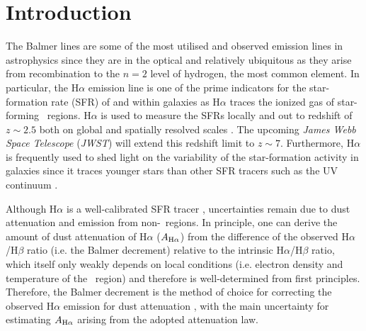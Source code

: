 \documentclass[fleqn,usenatbib]{mnras}
\newcommand\HII{\ion{H}{II}~} %
\begin{document}


\section{Introduction}
\label{sec:intro}

The Balmer lines are some of the most utilised and observed emission lines in astrophysics since they are in the optical and relatively ubiquitous as they arise from recombination to the $n=2$ level of hydrogen, the most common element. In particular, the H$\alpha$ emission line is one of the prime indicators for the star-formation rate (SFR) of and within galaxies as H$\alpha$ traces the ionized gas of star-forming \HII regions. H$\alpha$ is used to measure the SFRs locally and out to redshift of $z\sim2.5$ both on global \citep[][]{kennicutt83, lee09_UVHa, koyama15, shivaei15_SFR} and spatially resolved scales \citep[e.g.,][]{tacchella15, tacchella18_dust, nelson16_insideout, belfiore18, ellison18}. The upcoming \textit{James Webb Space Telescope} (\textit{JWST}) will extend this redshift limit to $z\sim7$. Furthermore, H$\alpha$ is frequently used to shed light on the variability of the star-formation activity in galaxies since it traces younger stars than other SFR tracers such as the UV continuum \citep[e.g.,][]{weisz12, guo16, caplar19, faisst19, haydon20}.

Although H$\alpha$ is a well-calibrated SFR tracer \citep[e.g.,][]{shivaei15_SFR}, uncertainties remain due to dust attenuation and emission from non-\HII regions. In principle, one can derive the amount of dust attenuation of H$\alpha$ ($A_{\rm H\alpha}$) from the difference of the observed H$\alpha$/H$\beta$ ratio (i.e. the Balmer decrement) relative to the intrinsic H$\alpha$/H$\beta$ ratio, which itself only weakly depends on local conditions (i.e. electron density and temperature of the \HII region) and therefore is well-determined from first principles. Therefore, the Balmer decrement is the method of choice for correcting the observed H$\alpha$ emission for dust attenuation \citep{berman36, calzetti94, groves12, nelson16_balmer}, with the main uncertainty for estimating $A_{\rm H\alpha}$ arising from the adopted attenuation law. 
\end{document}
